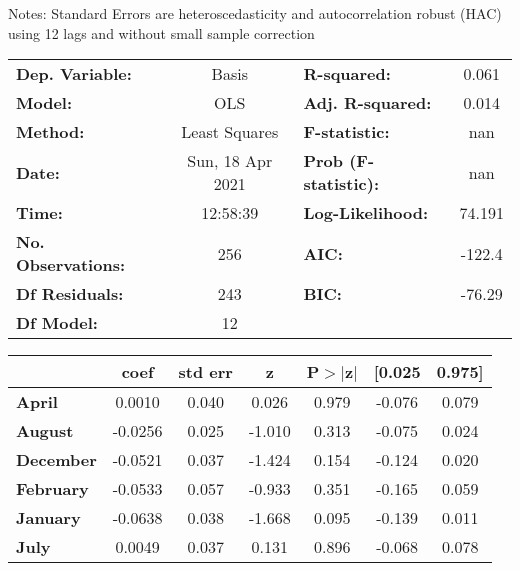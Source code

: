 Notes: \newline
 [1] Standard Errors are heteroscedasticity and autocorrelation robust (HAC) using 12 lags and without small sample correction
\begin{center}
\begin{tabular}{lclc}
\toprule
\textbf{Dep. Variable:}    &      Basis       & \textbf{  R-squared:         } &     0.061   \\
\textbf{Model:}            &       OLS        & \textbf{  Adj. R-squared:    } &     0.014   \\
\textbf{Method:}           &  Least Squares   & \textbf{  F-statistic:       } &       nan   \\
\textbf{Date:}             & Sun, 18 Apr 2021 & \textbf{  Prob (F-statistic):} &      nan    \\
\textbf{Time:}             &     12:58:39     & \textbf{  Log-Likelihood:    } &    74.191   \\
\textbf{No. Observations:} &         256      & \textbf{  AIC:               } &    -122.4   \\
\textbf{Df Residuals:}     &         243      & \textbf{  BIC:               } &    -76.29   \\
\textbf{Df Model:}         &          12      & \textbf{                     } &             \\
\bottomrule
\end{tabular}
\begin{tabular}{lcccccc}
                   & \textbf{coef} & \textbf{std err} & \textbf{z} & \textbf{P$> |$z$|$} & \textbf{[0.025} & \textbf{0.975]}  \\
\midrule
\textbf{April}     &       0.0010  &        0.040     &     0.026  &         0.979        &       -0.076    &        0.079     \\
\textbf{August}    &      -0.0256  &        0.025     &    -1.010  &         0.313        &       -0.075    &        0.024     \\
\textbf{December}  &      -0.0521  &        0.037     &    -1.424  &         0.154        &       -0.124    &        0.020     \\
\textbf{February}  &      -0.0533  &        0.057     &    -0.933  &         0.351        &       -0.165    &        0.059     \\
\textbf{January}   &      -0.0638  &        0.038     &    -1.668  &         0.095        &       -0.139    &        0.011     \\
\textbf{July}      &       0.0049  &        0.037     &     0.131  &         0.896        &       -0.068    &        0.078     \\

\end{tabular}
\end{center}
